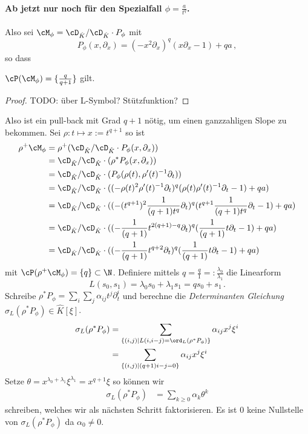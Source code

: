 \paragraph{Ab jetzt nur noch für den Spezialfall $\phi=\frac{a}{t^{q}}$.}
Also sei $\cM_\phi=\cD_{\hat K}/\cD_{\hat K}\cdot P_\phi$ mit
\[
P_{\phi}(x,\partial_x) =(-x^2\partial_x)^{q} (x\partial_x-1)+qa \,,
\]
so dass
\begin{lem}
$\cP(\cM_{\phi})=\{\frac{q}{q+1}\}$ gilt.
\end{lem}
\begin{proof} \cite[5.b.]{sabbah_Fourier-local}
TODO: über L-Symbol? Stützfunktion?
\end{proof}
Also ist ein pull-back mit Grad $q+1$ nötig, um einen ganzzahligen Slope zu
bekommen. Sei $\rho:t\mapsto x:=t^{q+1}$ so ist
\begin{align*}
\rho^+\cM_\phi &= \rho^+(\cD_{\hat K}/\cD_{\hat K}\cdot P_\phi(x,\partial_x))\\
  &=\cD_{\hat K}/\cD_{\hat K}\cdot(\rho^*P_\phi(x,\partial_x))\\
  &=\cD_{\hat K}/\cD_{\hat K}\cdot(P_\phi(\rho(t),\rho'(t)^{-1}\partial_t))\\
  &=\cD_{\hat K}/\cD_{\hat K}\cdot((-\rho(t)^2\rho'(t)^{-1}\partial_t)^{q}
    (\rho(t)\rho'(t)^{-1}\partial_t-1)+qa)\\
  &=\cD_{\hat K}/\cD_{\hat K}
    \cdot((-(t^{q+1})^2\frac{1}{(q+1)t^{q}}\partial_t)^{q}
    (t^{q+1}\frac{1}{(q+1)t^{q}}\partial_t-1)+qa)\\
  &=\cD_{\hat K}/\cD_{\hat K}
    \cdot((-\frac{1}{(q+1)}t^{2(q+1)-q}\partial_t)^{q}
    (\frac{1}{(q+1)}t\partial_t-1)+qa)\\
  &=\cD_{\hat K}/\cD_{\hat K}
    \cdot((-\frac{1}{(q+1)}t^{q+2}\partial_t)^{q}
    (\frac{1}{(q+1)}t\partial_t-1)+qa)
\end{align*}
mit $\cP(\rho^+\cM_\phi)=\{q\}\subset\N$. Definiere mittels
$q=\frac{q}{1}=:\frac{\lambda_0}{\lambda_1}$ die  Linearform
\[
L(s_0,s_1)=\lambda_0s_0+\lambda_1s_1=qs_0+s_1 \,.
\]
Schreibe $\rho^*P_{\phi}=\sum_i\sum_j\alpha_{ij}t^j\partial_t^i$ und berechne
die \emph{Determinanten Gleichung} $\sigma_L(\rho^*P_{\phi})\in \hat K[\xi]$.
\begin{align*}
\sigma_L(\rho^*P_{\phi})
  &= \sum_{\{(i,j) \mid L(i,i-j)=\ord_L(\rho^*P_{\phi})\}}\alpha_{ij}x^j\xi^i\\
  &= \sum_{\{(i,j) \mid (q+1)i-j=0\}}\alpha_{ij}x^j\xi^i
\end{align*}
Setze $\theta=x^{\lambda_0+\lambda_1}\xi^{\lambda_1}=x^{q+1}\xi$ so können wir
\begin{align*}
\sigma_L(\rho^*P_{\phi}) &= \sum_{k\geq 0}\alpha_k\theta^k
\end{align*}
schreiben, welches wir als nächsten Schritt faktorisieren.
Es ist $0$ keine Nullstelle von $\sigma_L(\rho^*P_\phi)$ da $\alpha_0\neq 0$.
\begin{comment}
HIER WEITER!! und gleichzeitig auch an den spezialfällen weiter machen!!!
\end{comment}

